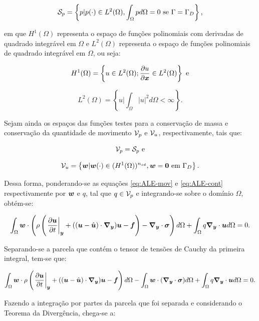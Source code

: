 \begin{equation}
    \mathcal{S}_p=\left\{p|p(\cdot)\in L^2(\Omega),\int_\Omega{pd\Omega}=0\text{ se }\Gamma=\Gamma_D\right\}\text{,}
\end{equation}

\noindent em que $H^1(\Omega)$ representa o espaço de funções polinomiais com derivadas de quadrado integrável em $\Omega$ e $L^2(\Omega)$ representa o espaço de funções polinomiais de quadrado integrável em $\Omega$, ou seja:

\begin{equation}
    H^1(\Omega)=\left\{u\in L^2(\Omega);\frac{\partial{u}}{\partial{\boldsymbol{x}}}\in L^2(\Omega)\right\}\text{ e}
\end{equation}

\begin{equation}
    L^2(\Omega)=\left\{u\big|\int_\Omega{|u|^2d\Omega}<\infty\right\}\text{.}
\end{equation}

Sejam ainda os espaços das funções testes para a conservação de massa e conservação da quantidade de movimento $\mathcal{V}_p$ e $\mathcal{V}_u$, respectivamente, tais que:

\begin{equation}
    \mathcal{V}_p=\mathcal{S}_p\text{ e}
\end{equation}

\begin{equation}
    \mathcal{V}_u=\left\{\boldsymbol{w}|\boldsymbol{w}(\cdot)\in(H^1(\Omega))^{n_{sd}},\boldsymbol{w}=\boldsymbol{0}\text{ em }\Gamma_D\right\}\text{.}
\end{equation}

Dessa forma, ponderando-se as equações \eqref{eq:ALE-mov} e \eqref{eq:ALE-cont} respectivamente por $\boldsymbol{w}$ e $q$, tal que $q\in\mathcal{V}_p$ e integrando-se sobre o domínio $\Omega$, obtém-se:

\begin{equation}
    \int_{\Omega}{\boldsymbol{w}\cdot\left({\rho\left({\left.\frac{\partial \boldsymbol{u}}{\partial t}\right|_{\boldsymbol{y}}+((\boldsymbol{u}-\hat{\boldsymbol{u}})\cdot\boldsymbol{\nabla_y})\boldsymbol{u}-\boldsymbol{f}}\right)-\boldsymbol{\nabla_y}\cdot\boldsymbol{\sigma}}\right) d\Omega}+\int_{\Omega}{q\boldsymbol{\nabla_y}\cdot\boldsymbol{u} d\Omega}=0\text{.}
\end{equation}

Separando-se a parcela que contém o tensor de tensões de Cauchy da primeira integral, tem-se que:

\[\int_{\Omega}{\boldsymbol{w}\cdot\rho\left({\left.\frac{\partial \boldsymbol{u}}{\partial t}\right|_{\boldsymbol{y}}+((\boldsymbol{u}-\hat{\boldsymbol{u}})\cdot\boldsymbol{\nabla_y})\boldsymbol{u}-\boldsymbol{f}}\right) d\Omega}-\int_{\Omega}{\boldsymbol{w}\cdot(\boldsymbol{\nabla_y}\cdot\boldsymbol{\sigma}) d\Omega}+\int_{\Omega}{q\boldsymbol{\nabla_y}\cdot\boldsymbol{u} d\Omega}=0\text{.}\]

Fazendo a integração por partes da parcela que foi separada e considerando o Teorema da Divergência, chega-se a:

